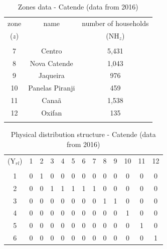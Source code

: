 \documentclass{singlecol}
\theoremstyle{TH}{
\newtheorem{lemma}{Lemma}
\newtheorem{theorem}[lemma]{Theorem}
\newtheorem{corrolary}[lemma]{Corrolary}
\newtheorem{conjecture}[lemma]{Conjecture}
\newtheorem{proposition}[lemma]{Proposition}
\newtheorem{claim}[lemma]{Claim}
\newtheorem{stheorem}[lemma]{Wrong Theorem}
\newtheorem{algorithm}{Algorithm}
}
\theoremstyle{THrm}{
\newtheorem{definition}{Definition}[section]
\newtheorem{question}{Question}[section]
\newtheorem{remark}{Remark}
\newtheorem{scheme}{Scheme}
}
\theoremstyle{THhit}{
\newtheorem{case}{Case}[section]
}
\begin{document}
\begin{table}[H]
\begin{center}
	\begin{tabular}{ c  c  c } 
		zone          & name         & number of households \\
		($z$)          &              & ($\mathrm{NH}_{z}$)   \\
		                                               \\
		7              & Centro           & 5,431 \\
		8              & Nova Catende     & 1,043 \\
		9              & Jaqueira         &   976 \\
	   10              & Panelas Piranji  &   459 \\
	   11              & Canaã            & 1,538 \\
	   12              & Oxifan           &   135 \\
	   \\
	\end{tabular}
\caption{Zones data - Catende (data from 2016)}
\label{tab:zonesCatende}
\end{center}
\end{table}

\begin{table}[H]
\begin{center}
	\begin{tabular}{ c c c c c c c c c c c c c } 

		($\mathrm{Y}_{rl}$)	& 1 & 2 & 3 & 4 & 5 & 6 & 7 & 8 & 9 & 10 & 11 & 12  \\
		                                                                      \\
		1	              	& 0 & 1 & 0 & 0 & 0 & 0 & 0 & 0 & 0 &  0 &  0 &  0  \\
		2                 	& 0 & 0 & 1 & 1 & 1 & 1 & 1 & 0 & 0 &  0 &  0 &  0  \\
		3                 	& 0 & 0 & 0 & 0 & 0 & 0 & 0 & 1 & 1 &  0 &  0 &  0  \\
		4                 	& 0 & 0 & 0 & 0 & 0 & 0 & 0 & 0 & 0 &  1 &  0 &  0  \\
		5                 	& 0 & 0 & 0 & 0 & 0 & 0 & 0 & 0 & 0 &  0 &  1 &  0  \\
	    6                 	& 0 & 0 & 0 & 0 & 0 & 0 & 0 & 0 & 0 &  0 &  0 &  1  \\
	\end{tabular}
\caption{Physical distribution structure - Catende (data from 2016)}
\label{tab:phyDitStr}
\end{center}
\end{table}
\end{document}
